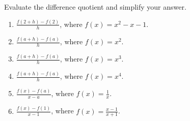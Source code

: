 Evaluate the difference quotient and simplify your answer. 
\begin{multicols}{2}
\begin{enumerate}[ref={\fcProblemRef}]
\item $\displaystyle \frac{f(2+h)-f(2)}{h}$, where $f(x)=x^2-x-1$.

\item $\displaystyle \frac{f(a+h)-f(a)}{h}$, where $f(x)= x^2$.

\item $\displaystyle \frac{f(a+h)-f(a)}{h}$, where $f(x)= x^3$.

\item $\displaystyle \frac{f(a+h)-f(a)}{h}$, where $f(x)= x^4$.

\item $\displaystyle \frac{f(x)-f(a)}{x-a}$, where $f(x)=\frac{1}{x}$.

\item $\displaystyle \frac{f(x)-f(1)}{x-1}$, where $f(x)=\frac{x-1}{x+1}$.

\end{enumerate}
\end{multicols}


